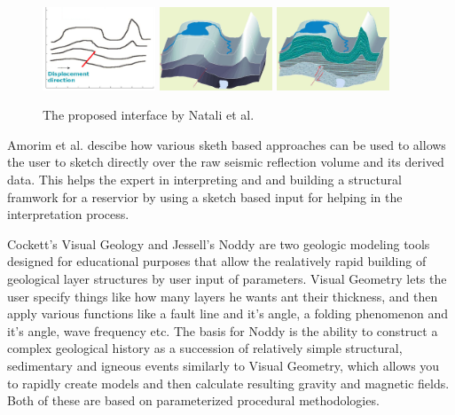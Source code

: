 \documentclass[a4paper,12pt]{report}
\begin{document}
\begin{figure}
 
 \centering
    \includegraphics[width=0.3\textwidth]{thesis/related/natali1.png}
    \includegraphics[width=0.3\textwidth]{thesis/related/natali2.png}
    \includegraphics[width=0.3\textwidth]{thesis/related/natali3.png}
  \caption{The proposed interface by Natali et al. }
  \label{fig:nataliRapid}
\end{figure}

Amorim et al. \cite{amorim2012sketch} descibe how various sketh based approaches can be used to allows the user to sketch directly over the raw seismic reflection volume and its derived data. This helps the expert in interpreting and and building a structural framwork for a reservior by using a sketch based input for helping in the interpretation process.

Cockett's Visual Geology \cite{Cockett:Online} and Jessell's Noddy \cite{jessell1981noddy} are two geologic modeling tools designed for educational purposes that allow the realatively rapid building of geological layer structures by user input of parameters. Visual Geometry lets the user specify things like how many layers he wants ant their thickness, and then apply various functions like a fault line and it's angle, a folding phenomenon and it's angle, wave frequency etc. The basis for Noddy is the ability to construct a complex geological history as a succession of relatively simple structural, sedimentary and igneous events similarly to Visual Geometry, which allows you to rapidly create models and then calculate resulting gravity and magnetic fields. Both of these are based on parameterized procedural methodologies.
\end{document}
